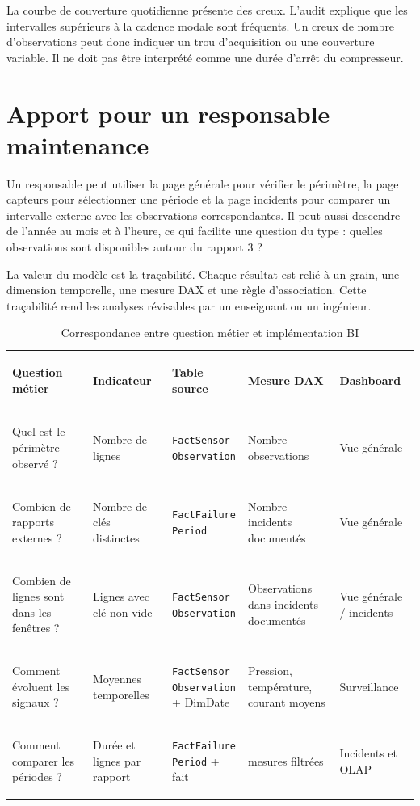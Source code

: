 La courbe de couverture quotidienne présente des creux. L'audit explique que les intervalles supérieurs à la cadence modale sont fréquents. Un creux de nombre d'observations peut donc indiquer un trou d'acquisition ou une couverture variable. Il ne doit pas être interprété comme une durée d'arrêt du compresseur.

\section{Apport pour un responsable maintenance}
Un responsable peut utiliser la page générale pour vérifier le périmètre, la page capteurs pour sélectionner une période et la page incidents pour comparer un intervalle externe avec les observations correspondantes. Il peut aussi descendre de l'année au mois et à l'heure, ce qui facilite une question du type : quelles observations sont disponibles autour du rapport 3 ?

La valeur du modèle est la traçabilité. Chaque résultat est relié à un grain, une dimension temporelle, une mesure DAX et une règle d'association. Cette traçabilité rend les analyses révisables par un enseignant ou un ingénieur.

\begin{table}[H]
\centering
\small
\setlength{\tabcolsep}{3pt}
\caption{Correspondance entre question métier et implémentation BI}
\label{tab:business-questions}
\begin{tabularx}{\textwidth}{>{\bfseries\raggedright\arraybackslash}p{2.8cm} >{\raggedright\arraybackslash}X >{\raggedright\arraybackslash}X >{\raggedright\arraybackslash}X >{\raggedright\arraybackslash}X}
\toprule
Question métier & Indicateur & Table source & Mesure DAX & Dashboard\\
\midrule
Quel est le périmètre observé ? & Nombre de lignes & \shortstack[l]{\texttt{FactSensor}\\\texttt{Observation}} & Nombre observations & Vue générale\\
Combien de rapports externes ? & Nombre de clés distinctes & \shortstack[l]{\texttt{FactFailure}\\\texttt{Period}} & Nombre incidents documentés & Vue générale\\
Combien de lignes sont dans les fenêtres ? & Lignes avec clé non vide & \shortstack[l]{\texttt{FactSensor}\\\texttt{Observation}} & Observations dans incidents documentés & Vue générale / incidents\\
Comment évoluent les signaux ? & Moyennes temporelles & \shortstack[l]{\texttt{FactSensor}\\\texttt{Observation}\\+ DimDate} & Pression, température, courant moyens & Surveillance\\
Comment comparer les périodes ? & Durée et lignes par rapport & \shortstack[l]{\texttt{FactFailure}\\\texttt{Period} + fait} & mesures filtrées & Incidents et OLAP\\
\bottomrule
\end{tabularx}
\normalsize
\setlength{\tabcolsep}{6pt}
\end{table}

